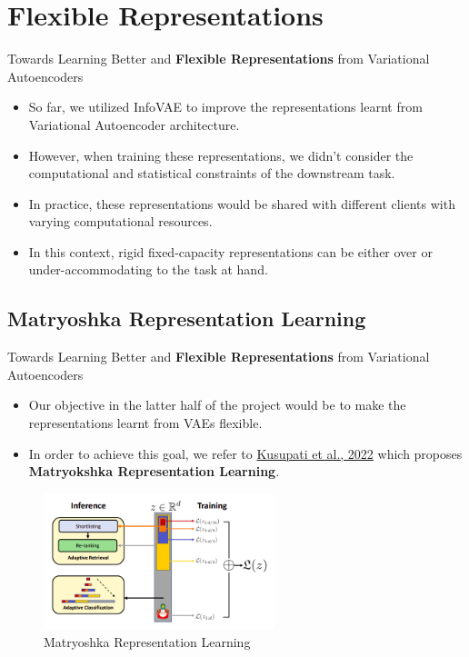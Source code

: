 \documentclass[hyperref={colorlinks,citecolor=blue,linkcolor=blue,urlcolor=blue}]{beamer}
\begin{document}
\section{Flexible Representations}

\begin{frame}{ Towards Learning Better and \textbf{Flexible Representations} from Variational Autoencoders \vspace{0.3em}}
  \begin{itemize}
    \item So far, we utilized InfoVAE to improve the representations learnt from Variational Autoencoder architecture.
    \item However, when training these representations, we didn't consider the computational and statistical constraints of the downstream task.
    \item In practice, these representations would be shared with different clients with varying computational resources. 
    \item In this context, rigid fixed-capacity representations can be either over or under-accommodating to the task at hand.
  \end{itemize}
\end{frame}

\subsection{Matryoshka Representation Learning}

\begin{frame}{ Towards Learning Better and \textbf{Flexible Representations} from Variational Autoencoders \vspace{0.3em}}
  \begin{itemize}
    \item Our objective in the latter half of the project would be to make the representations learnt from VAEs flexible.
    \item In order to achieve this goal, we refer to \href{https://proceedings.neurips.cc/paper_files/paper/2022/file/c32319f4868da7613d78af9993100e42-Paper-Conference.pdf}{Kusupati et al., 2022} which proposes \textbf{Matryokshka Representation Learning}.
  \end{itemize}
  \pause
  \begin{center}
    \begin{figure}
      \includegraphics[width=0.6\textwidth]{./Images/mrl.png}
      \caption{Matryoshka Representation Learning}
    \end{figure}
  \end{center}
\end{frame}
\end{document}
